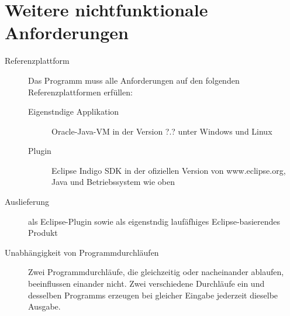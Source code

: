 \section{Weitere nichtfunktionale Anforderungen}%

\begin{description}%
    \item [Referenzplattform] Das Programm muss alle Anforderungen auf den folgenden Referenzplattformen erfüllen:
    \begin{description}
      \item [Eigenstndige Applikation] Oracle-Java-VM in der Version ?.? unter Windows und Linux
      \item [Plugin] Eclipse Indigo SDK in der ofiziellen Version von www.eclipse.org, Java und Betriebssystem wie oben
    \end{description}
    \item [Auslieferung] als Eclipse-Plugin sowie als eigenstndig laufäfhiges Eclipse-basierendes Produkt
    \item [Unabhängigkeit von Programmdurchläufen] Zwei Programmdurchläufe, die gleichzeitig oder nacheinander ablaufen, beeinflussen einander nicht. Zwei verschiedene Durchläufe ein und desselben Programms erzeugen bei gleicher Eingabe jederzeit dieselbe Ausgabe.
\end{description}
